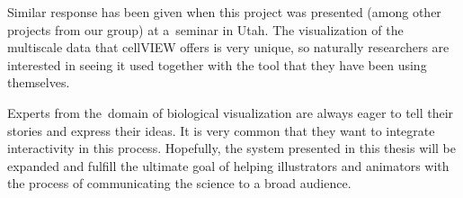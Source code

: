 \documentclass[
  digital, %
  table,   %
  nolof,     %
  nolot,     %
  oneside,
]{fithesis3}
\begin{document}
Similar response has been given when this project was presented (among other projects from our group) at a seminar in Utah. The visualization of the multiscale data that cellVIEW offers is very unique, so naturally researchers are interested in seeing it used together with the tool that they have been using themselves.

Experts from the domain of biological visualization are always eager to tell their stories and express their ideas. It is very common that they want to integrate interactivity in this process. Hopefully, the system presented in this thesis will be expanded and fulfill the ultimate goal of helping illustrators and animators with the process of communicating the science to a broad audience.


\newpage
\printbibliography[heading=bibintoc]

\end{document}
